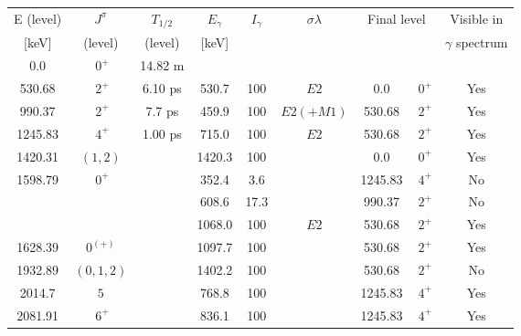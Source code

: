 \begin{tabular}{ccccccccc}
\hline
E (level) & $J^\pi$   & $T_{1/2}$  & $E_\gamma$ & $I_\gamma$ & $\sigma \lambda$ & \multicolumn{2}{c}{Final level} & Visible in        \\
{[keV]}   & (level)   & (level)    & [keV]      &            &                  &                 &               & $\gamma$ spectrum \\
\hline
0.0       & $~0^+$    &   14.82 m  &            &            &                  &                 &                &                   \\
530.68    & $~2^+$    &    6.10 ps &  530.7     & 100        & $E2$             &    0.0          & $~0^+$         & Yes               \\
990.37    & $~2^+$    &    7.7 ps  &  459.9     & 100        & $E2(+M1)$        &  530.68         & $~2^+$         & Yes               \\
1245.83   & $~4^+$    &    1.00 ps &  715.0     & 100        & $E2$             &  530.68         & $~2^+$         & Yes               \\
1420.31   & $(1,2)$   &            & 1420.3     & 100        &                  &    0.0          & $~0^+$         & Yes               \\
1598.79   & $~0^+$    &            &  352.4     &   3.6      &                  & 1245.83         & $~4^+$         & No                \\
          &           &            &  608.6     &  17.3      &                  &  990.37         & $~2^+$         & No                \\
          &           &            & 1068.0     & 100        & $E2$             &  530.68         & $~2^+$         & Yes               \\
1628.39   & $0^{(+)}$ &            & 1097.7     & 100        &                  &  530.68         & $~2^+$         & Yes               \\
1932.89   & $(0,1,2)$ &            & 1402.2     & 100        &                  &  530.68         & $~2^+$         & No                \\
2014.7    & $5$       &            &  768.8     & 100        &                  & 1245.83         & $~4^+$         & Yes               \\
2081.91   & $~6^+$    &            &  836.1     & 100        &                  & 1245.83         & $~4^+$         & Yes               \\

\end{tabular}
